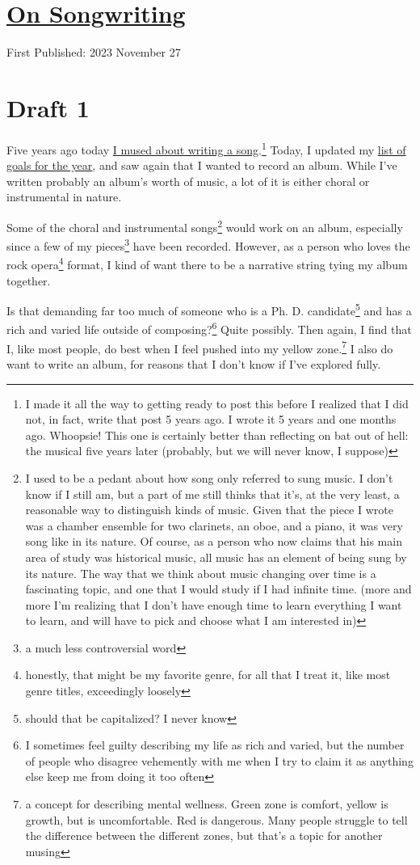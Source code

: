\documentclass[12pt]{article}[titlepage]
\newcommand{\1}{\={a}}
\newcommand{\2}{\={e}}
\newcommand{\3}{\={\i}}
\newcommand{\4}{\=o}
\newcommand{\5}{\=u}
\newcommand{\6}{\={A}}
\renewcommand{\,}{\textsuperscript{,}}
\begin{document}
\doublespacing
\section{\href{songwriting.html}{On Songwriting}}
First Published: 2023 November 27
\section{Draft 1}
Five years ago today \href{writing-a-song.html}{I mused about writing a song}.\footnote{I made it all the way to getting ready to post this before I realized that I did not, in fact, write that post 5 years ago.
I wrote it 5 years and one months ago.
Whoopsie! This one is certainly better than reflecting on bat out of hell: the musical five years later (probably, but we will never know, I suppose)}
Today, I updated my \href{twenty-five.html}{list of goals for the year}, and saw again that I wanted to record an album.
While I've written probably an album's worth of music, a lot of it is either choral or instrumental in nature.

Some of the choral and instrumental songs\footnote{I used to be a pedant about how song only referred to sung music.
I don't know if I still am, but a part of me still thinks that it's, at the very least, a reasonable way to distinguish kinds of music.
Given that the piece I wrote was a chamber ensemble for two clarinets, an oboe, and a piano, it was very song like in its nature.
Of course, as a person who now claims that his main area of study was historical music, all music has an element of being sung by its nature.
The way that we think about music changing over time is a fascinating topic, and one that I would study if I had infinite time.
(more and more I'm realizing that I don't have enough time to learn everything I want to learn, and will have to pick and choose what I am interested in)}
would work on an album, especially since a few of my pieces\footnote{a much less controversial word} have been recorded.
However, as a person who loves the rock opera\footnote{honestly, that might be my favorite genre, for all that I treat it, like most genre titles, exceedingly loosely} format, I kind of want there to be a narrative string tying my album together.

Is that demanding far too much of someone who is a Ph. D. candidate\footnote{should that be capitalized? I never know} and has a rich and varied life outside of composing?\footnote{I sometimes feel guilty describing my life as rich and varied, but the number of people who disagree vehemently with me when I try to claim it as anything else keep me from doing it too often}
Quite possibly.
Then again, I find that I, like most people, do best when I feel pushed into my yellow zone.\footnote{a concept for describing mental wellness. Green zone is comfort, yellow is growth, but is uncomfortable. Red is dangerous. Many people struggle to tell the difference between the different zones, but that's a topic for another musing}
I also do want to write an album, for reasons that I don't know if I've explored fully.
\end{document}
